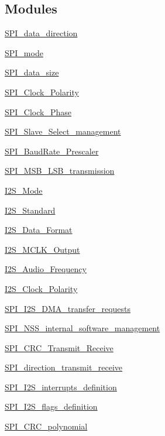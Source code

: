 \subsection*{Modules}
\begin{DoxyCompactItemize}
\item 
\hyperlink{group___s_p_i__data__direction}{S\+P\+I\+\_\+data\+\_\+direction}
\item 
\hyperlink{group___s_p_i__mode}{S\+P\+I\+\_\+mode}
\item 
\hyperlink{group___s_p_i__data__size}{S\+P\+I\+\_\+data\+\_\+size}
\item 
\hyperlink{group___s_p_i___clock___polarity}{S\+P\+I\+\_\+\+Clock\+\_\+\+Polarity}
\item 
\hyperlink{group___s_p_i___clock___phase}{S\+P\+I\+\_\+\+Clock\+\_\+\+Phase}
\item 
\hyperlink{group___s_p_i___slave___select__management}{S\+P\+I\+\_\+\+Slave\+\_\+\+Select\+\_\+management}
\item 
\hyperlink{group___s_p_i___baud_rate___prescaler}{S\+P\+I\+\_\+\+Baud\+Rate\+\_\+\+Prescaler}
\item 
\hyperlink{group___s_p_i___m_s_b___l_s_b__transmission}{S\+P\+I\+\_\+\+M\+S\+B\+\_\+\+L\+S\+B\+\_\+transmission}
\item 
\hyperlink{group___i2_s___mode}{I2\+S\+\_\+\+Mode}
\item 
\hyperlink{group___i2_s___standard}{I2\+S\+\_\+\+Standard}
\item 
\hyperlink{group___i2_s___data___format}{I2\+S\+\_\+\+Data\+\_\+\+Format}
\item 
\hyperlink{group___i2_s___m_c_l_k___output}{I2\+S\+\_\+\+M\+C\+L\+K\+\_\+\+Output}
\item 
\hyperlink{group___i2_s___audio___frequency}{I2\+S\+\_\+\+Audio\+\_\+\+Frequency}
\item 
\hyperlink{group___i2_s___clock___polarity}{I2\+S\+\_\+\+Clock\+\_\+\+Polarity}
\item 
\hyperlink{group___s_p_i___i2_s___d_m_a__transfer__requests}{S\+P\+I\+\_\+\+I2\+S\+\_\+\+D\+M\+A\+\_\+transfer\+\_\+requests}
\item 
\hyperlink{group___s_p_i___n_s_s__internal__software__management}{S\+P\+I\+\_\+\+N\+S\+S\+\_\+internal\+\_\+software\+\_\+management}
\item 
\hyperlink{group___s_p_i___c_r_c___transmit___receive}{S\+P\+I\+\_\+\+C\+R\+C\+\_\+\+Transmit\+\_\+\+Receive}
\item 
\hyperlink{group___s_p_i__direction__transmit__receive}{S\+P\+I\+\_\+direction\+\_\+transmit\+\_\+receive}
\item 
\hyperlink{group___s_p_i___i2_s__interrupts__definition}{S\+P\+I\+\_\+\+I2\+S\+\_\+interrupts\+\_\+definition}
\item 
\hyperlink{group___s_p_i___i2_s__flags__definition}{S\+P\+I\+\_\+\+I2\+S\+\_\+flags\+\_\+definition}
\item 
\hyperlink{group___s_p_i___c_r_c__polynomial}{S\+P\+I\+\_\+\+C\+R\+C\+\_\+polynomial}
\end{DoxyCompactItemize}

